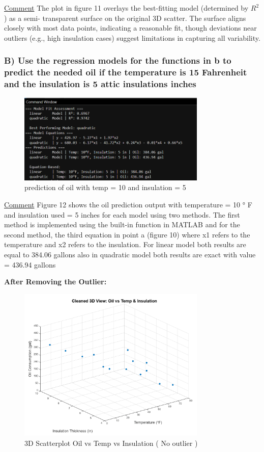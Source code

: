 \documentclass[12pt]{article}
\begin{document}
\uline{Comment}
The plot in figure 11 overlays the best-fitting model (determined by \(R^2\)) as a semi-
transparent surface on the original 3D scatter. The surface aligns closely with most data
points, indicating a reasonable fit, though deviations near outliers (e.g., high insulation
cases) suggest limitations in capturing all variability.

\subsubsection*{B) Use the regression models for the functions in b to predict the needed oil if the
temperature is 15 Fahrenheit and the insulation is 5 attic insulations inches}

\begin{figure}[H]
    \centering
    \includegraphics[width=0.8\textwidth]{12.png}
    \caption{prediction of oil with temp = 10 and insulation = 5}
\end{figure}

\uline{Comment}
Figure 12 shows the oil prediction output with temperature = 10 ° F and
insulation used = 5 inches for each model using two methods. The first method is
implemented using the built-in function in MATLAB and for the second method, the third
equation in point a (figure 10) where x1 refers to the temperature and x2 refers to the
insulation. For linear model both results are equal to 384.06 gallons also in quadratic
model both results are exact with value = 436.94 gallons

\textbf{After Removing the Outlier:}
\begin{figure}[h!]
    \centering
    \includegraphics[width=0.8\textwidth]{13.png}
    \caption{3D Scatterplot Oil vs Temp vs Insulation ( No outlier )}
\end{figure}
\end{document}
